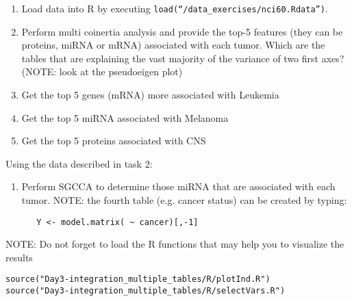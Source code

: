 \documentclass[11pt]{article}
\begin{document}
 
\begin{enumerate}
 \item Load data into R by executing \texttt{load(``/data\_exercises/nci60.Rdata'')}.
 \item Perform multi coinertia analysis and provide the top-5 features (they can be proteins, miRNA or mRNA) associated with each tumor. Which are the tables that are explaining the vast majority of the variance of two first axes? (NOTE: look at the pseudoeigen plot)
\item Get the top 5 genes (mRNA) more associated with Leukemia
\item Get the top 5 miRNA associated with Melanoma
\item Get the top 5 proteins associated with CNS
\end{enumerate}
 
\bigskip

 Using the data described in task 2: 

\begin{enumerate}
 \item Perform SGCCA to determine those miRNA that are associated with each tumor. NOTE: the fourth table (e.g. cancer status) can be created by typing:
 
 \begin{verbatim}
   Y <- model.matrix( ~ cancer)[,-1]
 \end{verbatim}

\end{enumerate}

\noindent NOTE: Do not forget to load the R functions that may help you to visualize the results
 \begin{verbatim}
source("Day3-integration_multiple_tables/R/plotInd.R")
source("Day3-integration_multiple_tables/R/selectVars.R")
\end{verbatim}
\end{document}
